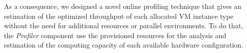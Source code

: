 
As a consequence, we designed a novel online profiling technique that gives an estimation of the optimized throughput of each allocated VM instance type without the need for additional resources or parallel environments. To do that, the \emph{Profiler} component use the provisioned resources for the analysis and estimation of the computing capacity of each available hardware configuration.


\begin{algorithm}
{\scriptsize
\SetAlgoLined
\SetInd{0mm}{2mm}


}
\end{algorithm}
